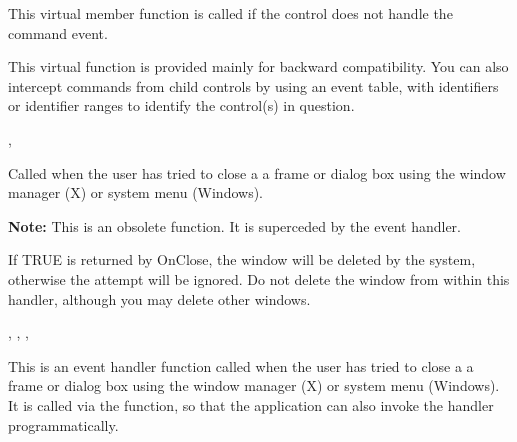\label{wxwindowoncommand}


This virtual member function is called if the control does not handle the command event.





This virtual function is provided mainly for backward compatibility. You can also intercept commands
from child controls by using an event table, with identifiers or identifier ranges to identify
the control(s) in question.


,\rtfsp
{}

\label{wxwindowonclose}


Called when the user has tried to close a a frame
or dialog box using the window manager (X) or system menu (Windows).

{\bf Note:} This is an obsolete function.
It is superceded by the  event
handler.


If TRUE is returned by OnClose, the window will be deleted by the system, otherwise the
attempt will be ignored. Do not delete the window from within this handler, although
you may delete other windows.


,\rtfsp
{},\rtfsp
{},\rtfsp
{}

\label{wxwindowonclosewindow}


This is an event handler function called when the user has tried to close a a frame
or dialog box using the window manager (X) or system menu (Windows). It is
called via the  function, so
that the application can also invoke the handler programmatically.

